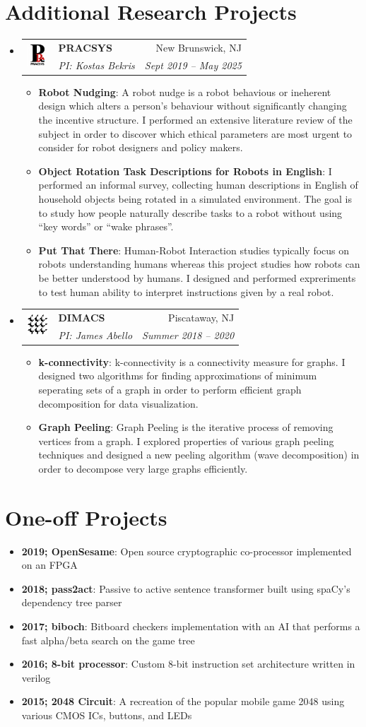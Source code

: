 \documentclass[letterpaper,11pt]{article}
\makeatletter
\newcommand{\resumeItem}[2]{
\item\small{
		\textbf{#1}{: #2 \vspace{-2pt}}
	}
}
\newcommand{\resumeSubheading}[5]{
	\vspace{-1pt}\item
	\begin{tabular*}{0.97\textwidth}[t]{ll@{\extracolsep{\fill}}r}
		\multirow{2}{*}{#1} & \textbf{#2} & #3 \\
				    & \textit{\small#4} & \textit{\small #5} \\
	\end{tabular*}\vspace{-5pt}
}
\newcommand{\resumeSubItem}[2]{\resumeItem{#1}{#2}\vspace{-4pt}}
\newcommand{\resumeSubHeadingListStart}{\begin{itemize}[leftmargin=*,label=]}
\newcommand{\resumeSubHeadingListEnd}{\end{itemize}}
\newcommand{\resumeItemListStart}{\begin{itemize}[label=$\bullet$]}
\newcommand{\resumeItemListEnd}{\end{itemize}\vspace{-5pt}}
\makeatother
\begin{document}
\section{Additional Research Projects}
\resumeSubHeadingListStart
\resumeSubheading
{\includegraphics[width=23pt]{./images/pracsys.png}}
{PRACSYS}{New Brunswick, NJ}
{PI: Kostas Bekris}{Sept 2019 -- May 2025}
\resumeItemListStart
\resumeItem{Robot Nudging}
{A robot nudge is a robot behavious or ineherent design which alters a person's behaviour without significantly changing the incentive structure. I performed an extensive literature review of the subject in order to discover which ethical parameters are most urgent to consider for robot designers and policy makers.}
\resumeItem{Object Rotation Task Descriptions for Robots in English}
{I performed an informal survey, collecting human descriptions in English of household objects being rotated in a simulated environment. The goal is to study how people naturally describe tasks to a robot without using ``key words'' or ``wake phrases''.}
\resumeItem{Put That There}
{Human-Robot Interaction studies typically focus on robots understanding humans whereas this project studies how robots can be better understood by humans. I designed and performed expreriments to test human ability to interpret instructions given by a real robot.}
\resumeItemListEnd
\resumeSubheading
{\includegraphics[width=23pt]{./images/dimacs.png}}
{DIMACS}{Piscataway, NJ}
{PI: James Abello}{Summer 2018 -- 2020}
\resumeItemListStart
\resumeItem{k-connectivity}
{k-connectivity is a connectivity measure for graphs. I designed two algorithms for finding approximations of minimum seperating sets of a graph in order to perform efficient graph decomposition for data visualization.}
\resumeItem{Graph Peeling}
{Graph Peeling is the iterative process of removing vertices from a graph. I explored properties of various graph peeling techniques and designed a new peeling algorithm (wave decomposition) in order to decompose very large graphs efficiently.}
\resumeItemListEnd
\resumeSubHeadingListEnd

\section{One-off Projects}
\resumeSubHeadingListStart
\resumeSubItem{2019; OpenSesame}
{Open source cryptographic co-processor implemented on an FPGA}
\resumeSubItem{2018; pass2act}
{Passive to active sentence transformer built using spaCy's dependency tree parser}
\resumeSubItem{2017; biboch}
{Bitboard checkers implementation with an AI that performs a fast alpha/beta search on the game tree}
\resumeSubItem{2016; 8-bit processor}
{Custom 8-bit instruction set architecture written in verilog}
\resumeSubItem{2015; 2048 Circuit}
{A recreation of the popular mobile game 2048 using various CMOS ICs, buttons, and LEDs}
\resumeSubHeadingListEnd
\end{document}
